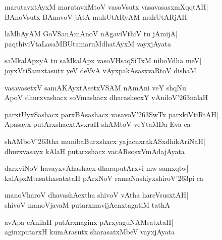 \documentclass[twoside,12pt,openright]{book}
\def\S{\char'263}
\newcounter{shloka}[chapter]
\begin{document}
\begin{shloka}%
marutavxtAyxM marutavxMtoV vasoVsutx vasavasasxmXqqtAH|\\
BAnoVsutx BAnavoV jAtA muhUtARyAM muhUtARjAH|\\
\end{shloka}

\begin{shloka}%
laMbAyAM GoVSanAmAnoV nAgaviVthiV tu jAmijA|\\
paqthiviVtaLasaMBUtamaruMdhatAyxM vayxjAyata
\end{shloka}

\begin{shloka}%
saMkalApxyA tu saMkalApx vasoVHsaqSiTxM niboVdha meV|\\
joyxVtiSamxtasutx yeV deVvA vAyxpakAsasxvaRtoV dishaM
\end{shloka}

\begin{shloka}%
vasavasetxV samAKAyxtAsetxVSAM nAmAni veY shqNu|\\
ApoV dhurxvashacx soVmashacx dharashecxY vAniloV\S nalaH
\end{shloka}

\begin{shloka}%
parxtUyxSashacx parxBAsashacx vasavoV\S SwTx parxkiVtiRtAH|\\
Apasayx putArxshacxtAvxraH shAMtoV veYtaMDa Eva ca
\end{shloka}

\begin{shloka}%
shAMboV\S tha munibaBurxshacx yajacnxrakASxdhikAriNaH|\\
dhurxvasayx kAlaH putarxshacx vacARsosxVmAdajAyata
\end{shloka}

\begin{shloka}%
darxviNoV havayxvAhashacx dharaputArxvi mw samxqtw|\\
kalApxMtasathxsatxtaH pArxNoV ramaNashiyxshiroV\S pi ca
\end{shloka}

\begin{shloka}%
manoVharoV dhavashAcxtha shivoV vAtha hareVsusxtAH|\\
shivoV manoVjavaM putarxmavijAcnxtagatiM tathA
\end{shloka}

\begin{shloka}%
avApa cAnilaH putArxnaginx pArxyaguNAMsatxtaH|\\
aginxputarxH kumArasutx sharasatxMbeV vayxjAyata
\end{shloka}
\end{document}

